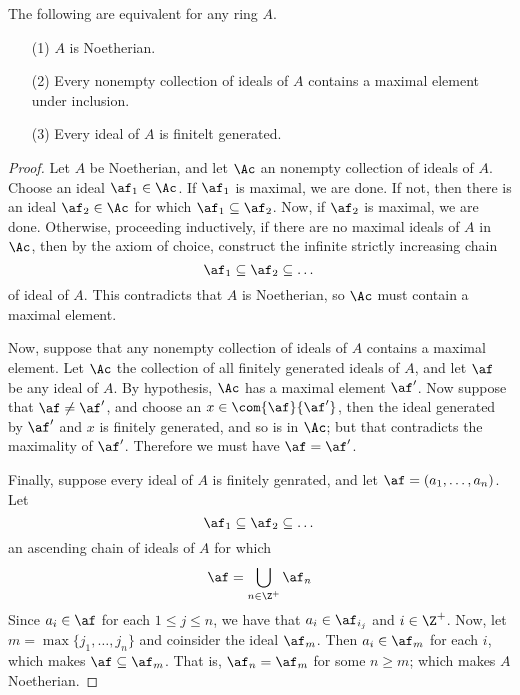 \begin{theorem}\label{1.12.2}
    The following are equivalent for any ring $A$.
    \begin{enumerate}
        \item[(1)] $A$ is Noetherian.

        \item[(2)] Every nonempty collection of ideals of $A$ contains a maximal
            element under inclusion.

        \item[(3)] Every ideal of $A$ is finitelt generated.
    \end{enumerate}
\end{theorem}
\begin{proof}
    Let $A$ be Noetherian, and let  $\Ac$ an nonempty collection of ideals of
    $A$. Choose an ideal  $\af_1 \in \Ac$. If $\af_1$ is maximal, we are done. If
    not, then there is an ideal $\af_2 \in \Ac$ for which  $\af_1 \subseteq \af_2$.
    Now, if $\af_2$ is maximal, we are done. Otherwise, proceeding inductively, if
    there are no maximal ideals of $A$ in $\Ac$, then by the axiom of choice,
    construct the infinite strictly increasing chain
    \begin{equation*}
         \af_1 \subseteq \af_2 \subseteq \dots
    \end{equation*}
    of ideal of $A$. This contradicts that  $A$ is Noetherian, so  $\Ac$ must
    contain a maximal element.

    Now, suppose that any nonempty collection of ideals of  $A$ contains
    a maximal element. Let  $\Ac$ the collection of all finitely generated
    ideals of $A$, and let $\af$ be any ideal of  $A$. By hypothesis, $\Ac$ has a
    maximal element  $\af'$. Now suppose that $\af \neq \af'$, and choose an
    $x \in \com{\af}{\af'}$, then the ideal generated by $\af'$ and  $x$ is finitely
    generated, and so is in  $\Ac$; but that contradicts the maximality of  $\af'$.
    Therefore we must have  $\af=\af'$.

    Finally, suppose every ideal of $A$ is finitely genrated, and let
    $\af=(a_1, \dots, a_n)$. Let
    \begin{equation*}
        \af_1 \subseteq \af_2 \subseteq \dots
    \end{equation*}
    an ascending chain of ideals of $A$ for which
    \begin{equation*}
        \af=\bigcup_{n \in \Z^+}{\af_n}
    \end{equation*}
    Since $a_i \in \af$ for each  $1 \leq j \leq n$, we have that  $a_i \in
    \af_{i_j}$ and $i \in \Z^+$. Now, let  $m=\max{\{j_1, \dots, j_n\}}$ and
    coinsider the ideal $\af_m$. Then  $a_i \in \af_m$ for each $i$, which makes
    $\af \subseteq \af_m$. That is, $\af_n=\af_m$ for some  $n \geq m$; which
    makes $A$ Noetherian.
\end{proof}

